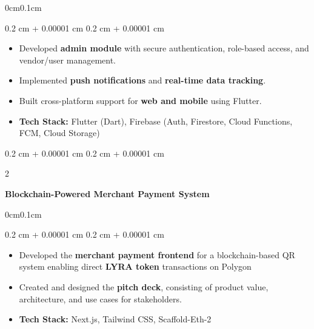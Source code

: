 \documentclass[10pt, letterpaper]{article}
\newenvironment{highlights}{
    \begin{itemize}[
        topsep=0.10 cm,
        parsep=0.10 cm,
        partopsep=0pt,
        itemsep=0pt,
        leftmargin=0.4 cm + 10pt,
        itemsep=0.1cm
    ]
}{
    \end{itemize}
} %
\newenvironment{onecolentry}{
    \begin{adjustwidth}{
        0.2 cm + 0.00001 cm
    }{
        0.2 cm + 0.00001 cm
    }
}{
    \end{adjustwidth}
} %
\newenvironment{twocolentry}[2][]{
    \onecolentry
    \def\secondColumn{#2}
    \setcolumnwidth{\fill, 4.5 cm}
    \begin{paracol}{2}
}{
    \switchcolumn \raggedleft \secondColumn
    \end{paracol}
    \endonecolentry
} %
\let\hrefWithoutArrow\href
\renewcommand{\href}[2]{\hrefWithoutArrow{#1}{\ifthenelse{\equal{#2}{}}{ }{#2 }\raisebox{.15ex}{\footnotesize \faExternalLink*}}}
\begin{document}
        \vspace{0.20 cm}
        \begin{adjustwidth}{0cm}{0.1cm}
            \begin{onecolentry}
                \begin{highlights}
                    \item Developed \textbf{admin module} with secure authentication, role-based access, and vendor/user management.
                    \item Implemented \textbf{push notifications} and \textbf{real-time data tracking}.
                    \item Built cross-platform support for \textbf{web and mobile} using Flutter.
                    \item \textbf{Tech Stack:} Flutter (Dart), Firebase (Auth, Firestore, Cloud Functions, FCM, Cloud Storage)
                    
                \end{highlights}
            \end{onecolentry}
        \end{adjustwidth}

        \vspace{0.20 cm}

        \begin{twocolentry}{
            
            
        \textit{\href{https://github.com/Tianweiii/lyra}{Lyra Repo}}}
            \textbf{Blockchain-Powered Merchant Payment System}
        \end{twocolentry}

        \vspace{0.20 cm}
        \begin{adjustwidth}{0cm}{0.1cm}
            \begin{onecolentry}
                \begin{highlights}
                \item Developed the \textbf{merchant payment frontend} for a blockchain-based QR system enabling direct \textbf{LYRA token} transactions on Polygon
                
                \item Created and designed the \textbf{pitch deck}, consisting of product value, architecture, and use cases for stakeholders.
                
                \item \textbf{Tech Stack:} Next.js, Tailwind CSS, Scaffold-Eth-2
                    
                \end{highlights}
            \end{onecolentry}
        \end{adjustwidth}
\end{document}
